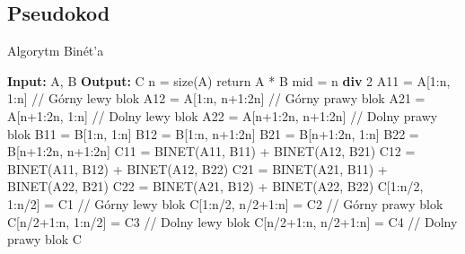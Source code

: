 \documentclass[11pt, leqno]{scrartcl}
\begin{document}
    \subsection{Pseudokod}
    \begin{algorithm}[H]
        \caption{Algorytm Binét'a}
        \begin{algorithmic}
            \State \textbf{Input:} A, B
            \State \textbf{Output:} C
                \State n = size(A)
                    \State return A * B
                \EndIf
                \State
                \State mid = n \textbf{div} 2
                \State A11 = A[1:n, 1:n]       // Górny lewy blok
                \State A12 = A[1:n, n+1:2n]    // Górny prawy blok
                \State A21 = A[n+1:2n, 1:n]    // Dolny lewy blok
                \State A22 = A[n+1:2n, n+1:2n] // Dolny prawy blok
                \State B11 = B[1:n, 1:n]
                \State B12 = B[1:n, n+1:2n]
                \State B21 = B[n+1:2n, 1:n]
                \State B22 = B[n+1:2n, n+1:2n]
                \State
                \State C11 = BINET(A11, B11) + BINET(A12, B21)
                \State C12 = BINET(A11, B12) + BINET(A12, B22)
                \State C21 = BINET(A21, B11) + BINET(A22, B21)
                \State C22 = BINET(A21, B12) + BINET(A22, B22)
                \State
                \State C[1:n/2, 1:n/2] = C1      // Górny lewy blok
                \State C[1:n/2, n/2+1:n] = C2    // Górny prawy blok
                \State C[n/2+1:n, 1:n/2] = C3    // Dolny lewy blok
                \State C[n/2+1:n, n/2+1:n] = C4  // Dolny prawy blok
                \State \Return C
            \EndFunction
        \end{algorithmic}
    \end{algorithm}
\end{document}
